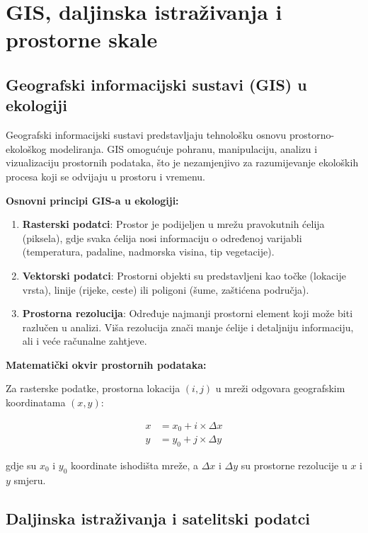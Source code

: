 \documentclass[11pt,oneside]{book}
\begin{document}
\section{GIS, daljinska istraživanja i prostorne skale}

\subsection{Geografski informacijski sustavi (GIS) u ekologiji}

Geografski informacijski sustavi predstavljaju tehnološku osnovu prostorno-ekološkog modeliranja. GIS omogućuje pohranu, manipulaciju, analizu i vizualizaciju prostornih podataka, što je nezamjenjivo za razumijevanje ekoloških procesa koji se odvijaju u prostoru i vremenu.

\textbf{Osnovni principi GIS-a u ekologiji:}

\begin{enumerate}
	\item \textbf{Rasterski podatci}: Prostor je podijeljen u mrežu pravokutnih ćelija (piksela), gdje svaka ćelija nosi informaciju o određenoj varijabli (temperatura, padaline, nadmorska visina, tip vegetacije).
	
	\item \textbf{Vektorski podatci}: Prostorni objekti su predstavljeni kao točke (lokacije vrsta), linije (rijeke, ceste) ili poligoni (šume, zaštićena područja).
	
	\item \textbf{Prostorna rezolucija}: Određuje najmanji prostorni element koji može biti razlučen u analizi. Viša rezolucija znači manje ćelije i detaljniju informaciju, ali i veće računalne zahtjeve.
\end{enumerate}

\textbf{Matematički okvir prostornih podataka:}

Za rasterske podatke, prostorna lokacija $(i,j)$ u mreži odgovara geografskim koordinatama $(x,y)$:

\begin{align}
	x &= x_0 + i \times \Delta x \\
	y &= y_0 + j \times \Delta y
\end{align}

gdje su $x_0$ i $y_0$ koordinate ishodišta mreže, a $\Delta x$ i $\Delta y$ su prostorne rezolucije u $x$ i $y$ smjeru.

\subsection{Daljinska istraživanja i satelitski podatci}
\end{document}
